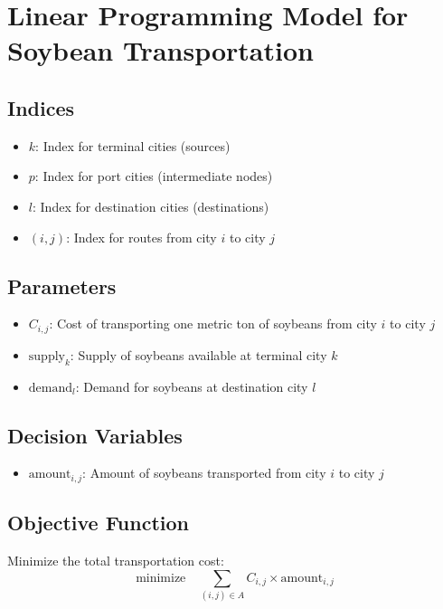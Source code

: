 \documentclass{article}
\begin{document}
\section*{Linear Programming Model for Soybean Transportation}

\subsection*{Indices}
\begin{itemize}
    \item \( k \): Index for terminal cities (sources)
    \item \( p \): Index for port cities (intermediate nodes)
    \item \( l \): Index for destination cities (destinations)
    \item \( (i, j) \): Index for routes from city \( i \) to city \( j \)
\end{itemize}

\subsection*{Parameters}
\begin{itemize}
    \item \( C_{i,j} \): Cost of transporting one metric ton of soybeans from city \( i \) to city \( j \)
    \item \( \text{supply}_k \): Supply of soybeans available at terminal city \( k \)
    \item \( \text{demand}_l \): Demand for soybeans at destination city \( l \)
\end{itemize}

\subsection*{Decision Variables}
\begin{itemize}
    \item \( \text{amount}_{i,j} \): Amount of soybeans transported from city \( i \) to city \( j \)
\end{itemize}

\subsection*{Objective Function}
Minimize the total transportation cost:
\[
\text{minimize} \quad \sum_{(i,j) \in A} C_{i,j} \times \text{amount}_{i,j}
\]
\end{document}
